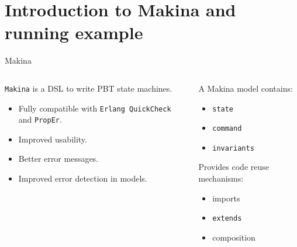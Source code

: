 \documentclass[aspectratio=169, 10pt]{beamer}
\begin{document}
\section{Introduction to Makina and running example}
\label{sec:org75be24b}
\begin{frame}[label={sec:orgbfeb711},fragile]{Makina}
 \begin{columns}
\begin{column}{0.48\columnwidth}
\texttt{Makina} is a DSL to write PBT state machines.
\begin{itemize}
\item Fully compatible with \texttt{Erlang QuickCheck} and \texttt{PropEr}.
\item Improved usability.
\item Better error messages.
\item Improved error detection in models.
\end{itemize}
\end{column}

\begin{column}{0.48\columnwidth}
A Makina model contains:
\begin{itemize}
\item \texttt{state}
\item \texttt{command}
\item \texttt{invariants}
\end{itemize}

\vspace{10pt}

Provides code reuse mechanisms:
\begin{itemize}
\item imports
\item \texttt{extends}
\item composition
\end{itemize}
\end{column}
\end{columns}
\end{frame}
\end{document}
